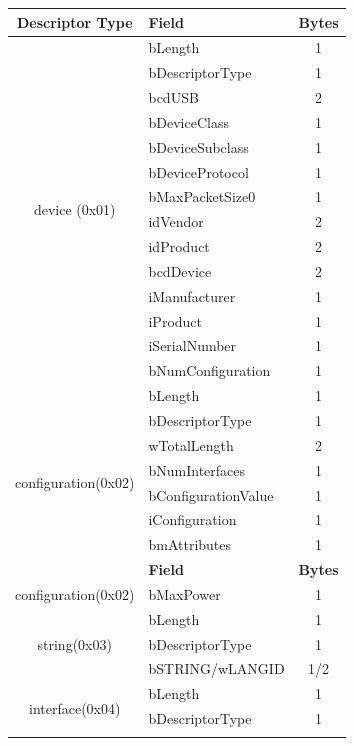 \begin{longtable}{|c|l|c|} \hline
    \textbf{Descriptor Type} & \textbf{Field} & \textbf{Bytes} \\ \hline
    \multirow{14}{*}{device (0x01)} & bLength & 1 \\ \cline{2-3}
      & bDescriptorType & 1 \\ \cline{2-3} 
      & bcdUSB          & 2 \\ \cline{2-3}
      & bDeviceClass    & 1 \\ \cline{2-3}
      & bDeviceSubclass & 1 \\ \cline{2-3}
      & bDeviceProtocol & 1 \\ \cline{2-3}
      & bMaxPacketSize0 & 1 \\ \cline{2-3}
      & idVendor        & 2 \\ \cline{2-3}
      & idProduct       & 2 \\ \cline{2-3}
      & bcdDevice       & 2 \\ \cline{2-3}
      & iManufacturer   & 1 \\ \cline{2-3}
      & iProduct        & 1 \\ \cline{2-3}
      & iSerialNumber   & 1 \\ \cline{2-3}
      & bNumConfiguration & 1 \\ \hline
    \multirow{8}{*}{configuration(0x02)} & bLength & 1 \\ \cline{2-3}
      & bDescriptorType & 1 \\ \cline{2-3} 
      & wTotalLength    & 2 \\ \cline{2-3}
      & bNumInterfaces  & 1 \\ \cline{2-3}
      & bConfigurationValue & 1 \\ \cline{2-3}
      & iConfiguration  & 1 \\ \cline{2-3}
      & bmAttributes    & 1 \\ \hline
    \pagebreak \hline
    \textbf{Descriptor Type} & \textbf{Field} & \textbf{Bytes} \\ \hline
      configuration(0x02) & bMaxPower       & 1 \\ \hline
    \multirow{3}{*}{string(0x03)} & bLength & 1 \\ \cline{2-3}
      & bDescriptorType & 1 \\ \cline{2-3}
      & bSTRING/wLANGID & 1/2 \\ \hline
    \multirow{9}{*}{interface(0x04)} & bLength & 1 \\ \cline{2-3}
      & bDescriptorType & 1 \\ \cline{2-3}

\end{longtable}
